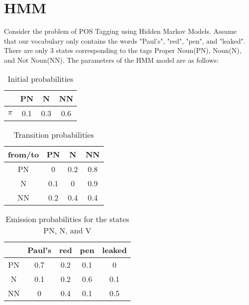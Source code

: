 \documentclass[12pt, letterpaper]{article}
\begin{document}
\section{HMM}

Consider the problem of POS Tagging using Hidden Markov Models. Assume that our vocabulary only contains the words "Paul's", "red", "pen", and "leaked". There are only 3 states corresponding to the tags Proper Noun(PN), Noun(N), and Not Noun(NN). The parameters of the HMM model are as follows:

\begin{table}[h!]
\begin{center}

\begin{tabular}{ |c|c|c|c| } 
\hline
 & PN & N & NN \\
\hline
$\pi$ & 0.1 & 0.3 & 0.6 \\ 
\hline
\end{tabular}
\caption{Initial probabilities}
\end{center}
\end{table}

\begin{table}[h!]
\begin{center}
\begin{tabular}{ |c|c|c|c| } 
\hline
from/to & PN & N & NN \\
\hline
PN & 0   & 0.2 & 0.8 \\
N  & 0.1 & 0   & 0.9 \\
NN & 0.2 & 0.4 & 0.4 \\
\hline
\end{tabular}
\caption{Transition probabilities}
\end{center}
\end{table}

\begin{table}[h!]
\begin{center}
\begin{tabular}{ |c|c|c|c|c| } 
\hline
 & Paul's & red & pen & leaked \\
\hline
PN & 0.7 & 0.2 & 0.1 & 0 \\
N  & 0.1 & 0.2 & 0.6 & 0.1 \\
NN & 0   & 0.4 & 0.1 & 0.5 \\
\hline
\end{tabular}
\caption{Emission probabilities for the states PN, N, and V}
\end{center}
\end{table}

\newpage
\end{document}

